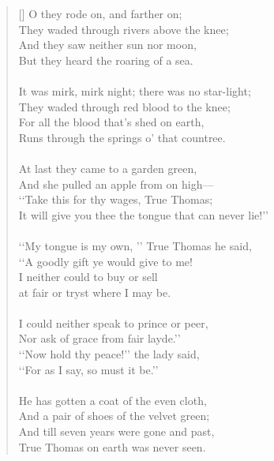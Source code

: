 \documentclass[a4paper]{article}
\begin{document}
\begin{verse}[\versewidth]
    O they rode on, and farther on; \\ 
    They waded through rivers above the knee; \\ 
    And they saw neither sun nor moon, \\ 
    But they heard the roaring of a sea. \\ \\ 

    It was mirk, mirk night; there was no star-light;\\ 
    They waded through red blood to the knee; \\ 
    For all the blood that\rq{}s shed on earth, \\
    Runs through the springs o\rq{} that countree. \\ \\ 

    At last they came to a garden green, \\ 
    And she pulled an apple from on high---\\ 
    \lq\lq Take this for thy wages, True Thomas; \\ 
    It will give you thee the tongue that can never lie!\rq\rq{} \\ \\ 

    \lq\lq My tongue is my own, \rq\rq{} True Thomas he said, \\ 
    \lq\lq A goodly gift ye would give to me! \\ 
    I neither could to buy or sell \\ 
    at fair or tryst where I may be. \\  \\ 

    I could neither speak to prince or peer, \\ 
    Nor ask of grace from fair layde.\rq\rq{} \\ 
    \lq\lq Now hold thy peace!\rq\rq{} the lady said, \\ 
    \lq\lq For as I say, so must it be.\rq\rq{} \\ \\ 

    He has gotten a coat of the even cloth, \\ 
    And a pair of shoes of the velvet green; \\ 
    And till seven years were gone and past, \\ 
    True Thomas on earth was never seen.
\end{verse}
\end{document}
